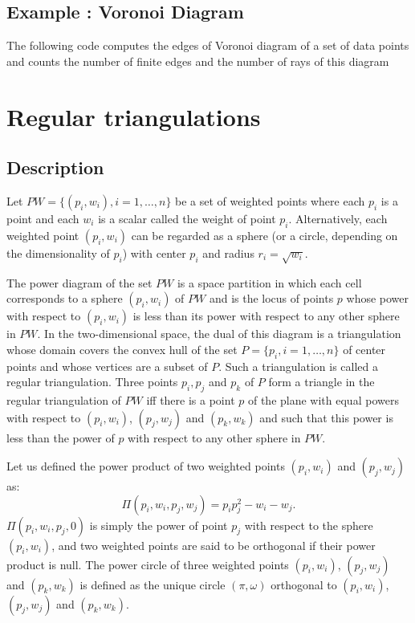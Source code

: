 \subsection{Example : Voronoi Diagram}
\label{Subsection_2D_Triangulations_Voronoi}
The following code computes the edges of Voronoi diagram
of a set of data points
and counts  the number of finite edges and the number of rays
of this diagram


\section{Regular triangulations}
\label{Section_2D_Triangulations_Regular}

\subsection{Description}
\label{Subsection_2D_Triangulations_Regular_Description}
Let ${  PW} = \{(p_i, w_i), i = 1, \ldots , n \}$ be a set of 
weighted points where each $p_i$ is a point and each $w_i$
is a scalar called the weight of point $p_i$.
Alternatively, each weighted point $(p_i, w_i)$ can be regarded
as a sphere (or a circle, depending on the dimensionality
of $p_i$)  with center $p_i$ and radius $r_i=\sqrt{w_i}$.

The power diagram of the set ${  PW}$ is a space partition in which
 each cell corresponds to a sphere $(p_i, w_i)$ of ${  PW}$
and is the locus of points  $p$ whose power with respect to $(p_i, w_i)$
is less than its power with respect to any other sphere 
in ${  PW}$. In the two-dimensional space,
the dual of this diagram is a triangulation 
whose domain covers the convex hull of the set 
${  P}= \{ p_i, i = 1, \ldots , n \}$ of center points
and whose vertices are a subset of ${  P}$.
Such a triangulation is called a regular triangulation.
Three points $p_i, p_j$ and $p_k$ of ${  P}$
form a triangle in the regular triangulation of ${  PW}$
iff there is a point $p$ of the plane with equal 
powers with respect to $(p_i, w_i)$, $(p_j, w_j)$
and $(p_k, w_k)$ and such that this power 
is  less than the power of $p$
with respect to any other sphere in  ${  PW}$.

Let us defined the power product of two weighted points
$(p_i, w_i)$ and $(p_j, w_j)$ as:
\[\Pi(p_i, w_i,p_j, w_j) = p_ip_j ^2 - w_i  - w_j  .\]
$\Pi(p_i, w_i,p_j, 0)$ is simply the power of point $p_j$
with respect to the sphere $(p_i, w_i)$, and two weighted points 
are said to be orthogonal if their power product is null.
The power circle of three weighted points
 $(p_i, w_i)$, $(p_j, w_j)$
and $(p_k, w_k)$ is defined as the unique circle
$(\pi, \omega)$  orthogonal to
 $(p_i, w_i)$, $(p_j, w_j)$
and $(p_k, w_k)$.

